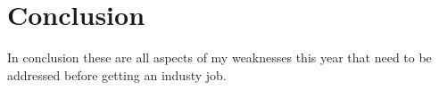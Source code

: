 \documentclass{scrartcl}
\begin{document}
%
\subsection{ }





\par


\section{Conclusion}
In conclusion these are all aspects of my weaknesses this year that need to be addressed before getting an industy job.  


%



\end{document}
